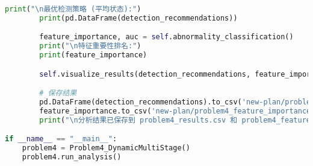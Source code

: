 \documentclass[UTF8, a4paper, 11pt]{ctexart}
\begin{document}
\begin{lstlisting}[language=Python, caption={问题四的解决方案脚本。}]
        print("\n最优检测策略 (平均状态):")
        print(pd.DataFrame(detection_recommendations))

        feature_importance, auc = self.abnormality_classification()
        print("\n特征重要性排名:")
        print(feature_importance)

        self.visualize_results(detection_recommendations, feature_importance)

        # 保存结果
        pd.DataFrame(detection_recommendations).to_csv('new-plan/problem4_results.csv', index=False)
        feature_importance.to_csv('new-plan/problem4_feature_importance.csv', index=False)
        print("\n分析结果已保存到 problem4_results.csv 和 problem4_feature_importance.csv")

if __name__ == "__main__":
    problem4 = Problem4_DynamicMultiStage()
    problem4.run_analysis()
\end{lstlisting}
\end{document}
